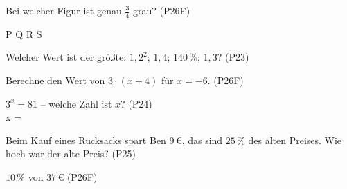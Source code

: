 \documentclass[11pt]{article}
\begin{document}
\small

\begin{aufgabe}{Bei welcher Figur ist genau $\frac{3}{4}$ grau? \hfill (P26F) \\    }

P  \quad Q  \quad R  \quad S 
\end{aufgabe}

\begin{aufgabe}{Welcher Wert ist der größte: $1{,}2^2$; $1{,}4$; $140\,\%$; $1{,}3$? \hfill (P23) \\ \leerfeld}
\end{aufgabe}

\begin{aufgabe}{Berechne den Wert von $3 \cdot (x + 4)$ für $x = -6$. \hfill (P26F) \\ \leerfeld}
\end{aufgabe}

\begin{aufgabe}{$3^x = 81$ – welche Zahl ist $x$? \hfill (P24) \\ x = \leerfeld}
\end{aufgabe}

\begin{aufgabe}{Beim Kauf eines Rucksacks spart Ben $9\,€$, das sind $25\,\%$ des alten Preises. Wie hoch war der alte Preis? \hfill (P25) \\ \leerfeld[€]}
\end{aufgabe}

\begin{aufgabe}{$10\,\%$ von $37\,€$ \hfill (P26F) \\ \leerfeld[€]}
\end{aufgabe}
\end{document}
